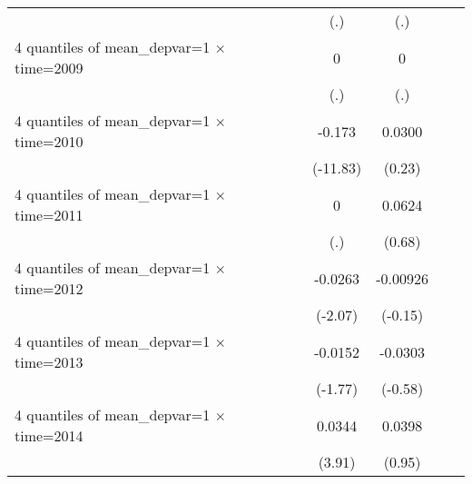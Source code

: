 \begin{table}[htbp]
\begin{tabular}{l*{6}{c}}
                    &                     &                     &         (.)         &         (.)         &                     &                     \\
[1em]
4 quantiles of mean\_depvar=1 $\times$ time=2009&                     &                     &           0         &           0         &                     &                     \\
                    &                     &                     &         (.)         &         (.)         &                     &                     \\
[1em]
4 quantiles of mean\_depvar=1 $\times$ time=2010&                     &                     &      -0.173\sym{***}&      0.0300         &                     &                     \\
                    &                     &                     &    (-11.83)         &      (0.23)         &                     &                     \\
[1em]
4 quantiles of mean\_depvar=1 $\times$ time=2011&                     &                     &           0         &      0.0624         &                     &                     \\
                    &                     &                     &         (.)         &      (0.68)         &                     &                     \\
[1em]
4 quantiles of mean\_depvar=1 $\times$ time=2012&                     &                     &     -0.0263\sym{*}  &    -0.00926         &                     &                     \\
                    &                     &                     &     (-2.07)         &     (-0.15)         &                     &                     \\
[1em]
4 quantiles of mean\_depvar=1 $\times$ time=2013&                     &                     &     -0.0152\sym{*}  &     -0.0303         &                     &                     \\
                    &                     &                     &     (-1.77)         &     (-0.58)         &                     &                     \\
[1em]
4 quantiles of mean\_depvar=1 $\times$ time=2014&                     &                     &      0.0344\sym{***}&      0.0398         &                     &                     \\
                    &                     &                     &      (3.91)         &      (0.95)         &                     &                     \\

\end{tabular}
\end{table}
